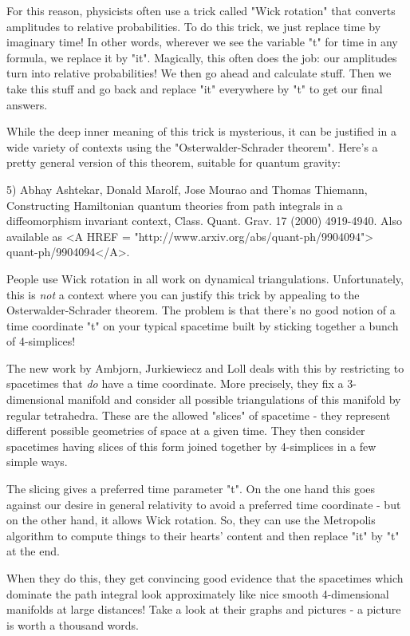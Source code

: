 For this reason, physicists often use a trick called "Wick rotation"
that converts amplitudes to relative probabilities.  To do this trick, we
just replace time by imaginary time!  In other words, wherever we see the 
variable "t" for time in any formula, we replace it 
by "it".  Magically,
this often does the job: our amplitudes turn into relative probabilities!
We then go ahead and calculate stuff.  Then we take this stuff and go 
back and replace "it" everywhere by "t" to get our final 
answers.

While the deep inner meaning of this trick is mysterious, it can be 
justified in a wide variety of contexts using the "Osterwalder-Schrader
theorem".  Here's a pretty general version of this theorem, suitable
for quantum gravity:

5) Abhay Ashtekar, Donald Marolf, Jose Mourao and Thomas Thiemann,
Constructing Hamiltonian quantum theories from path integrals in a 
diffeomorphism invariant context, 
Class. Quant. Grav. 17 (2000) 4919-4940.  Also
available as <A HREF = "http://www.arxiv.org/abs/quant-ph/9904094">
quant-ph/9904094</A>.

People use Wick rotation in all work on dynamical triangulations. 
Unfortunately, this is \emph{not} a context where you can justify this trick
by appealing to the Osterwalder-Schrader theorem.  The problem is that
there's no good notion of a time coordinate "t" on your typical 
spacetime built by sticking together a bunch of 4-simplices!  

The new work by Ambjorn, Jurkiewiecz and Loll deals with this by 
restricting to spacetimes that \emph{do} have a time coordinate.  More 
precisely, they fix a 3-dimensional manifold and consider all possible 
triangulations of this manifold by regular tetrahedra.  These are the 
allowed "slices" of spacetime - they represent different possible 
geometries of space at a given time.  They then consider spacetimes 
having slices of this form joined together by 4-simplices in a few 
simple ways.  

The slicing gives a preferred time parameter "t".  On the one hand 
this
goes against our desire in general relativity to avoid a preferred time 
coordinate - but on the other hand, it allows Wick rotation.  So, they 
can use the Metropolis algorithm to compute things to their hearts'
content and then replace "it" by "t" at the end.  

When they do this, they get convincing good evidence that the spacetimes 
which dominate the path integral look approximately like nice smooth 
4-dimensional manifolds at large distances!  Take a look at their graphs 
and pictures - a picture is worth a thousand words.

